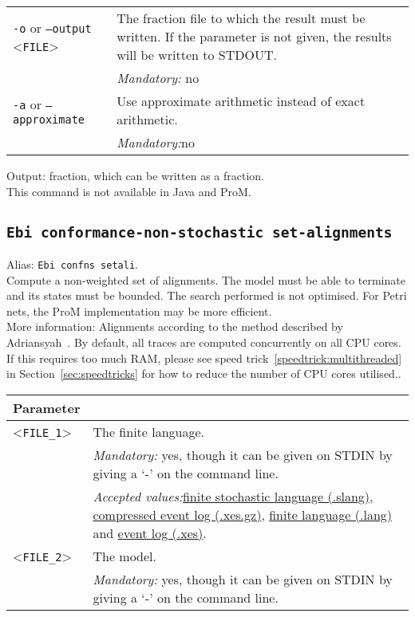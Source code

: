 {\begin{tabularx}{\linewidth}{lX}
\texttt{-o} or \texttt{--output} <\texttt{FILE}> &
The fraction file to which the result must be written. If the parameter is not given, the results will be written to STDOUT.\\
&\textit{Mandatory:} \quad no\\
\texttt{-a} or \texttt{--approximate} & Use approximate arithmetic instead of exact arithmetic.\\
&\textit{Mandatory:}\quad no\\
\bottomrule
\end{tabularx}
\noindent Output: fraction, which can be written as a fraction.
\\This command is not available in Java and ProM.
\subsection{\texttt{Ebi conformance-non-stochastic set-alignments}}
\label{command:Ebi conformance-non-stochastic set-alignments}
Alias: \texttt{Ebi confns setali}.\\
Compute a non-weighted set of alignments.
The model must be able to terminate and its states must be bounded. The search performed is not optimised. For Petri nets, the ProM implementation may be more efficient.\\
More information: Alignments according to the method described by Adriansyah~\cite{DBLP:conf/edoc/AdriansyahDA11}. By default, all traces are computed concurrently on all CPU cores. If this requires too much RAM, please see speed trick~\ref{speedtrick:multithreaded} in Section~\ref{sec:speedtricks} for how to reduce the number of CPU cores utilised..\\
\begin{tabularx}{\linewidth}{lX}
\toprule
Parameter \\\midrule
<\texttt{FILE\_1}>&The finite language.\\
&\textit{Mandatory:} \quad yes, though it can be given on STDIN by giving a `-' on the command line.\\
&\textit{Accepted values:}\quad \hyperref[filehandler:finite stochastic language]{finite stochastic language (.slang)}, \hyperref[filehandler:compressed event log]{compressed event log (.xes.gz)}, \hyperref[filehandler:finite language]{finite language (.lang)} and \hyperref[filehandler:event log]{event log (.xes)}.\\
<\texttt{FILE\_2}>&The model.\\
&\textit{Mandatory:} \quad yes, though it can be given on STDIN by giving a `-' on the command line.\\

\end{tabularx}}
